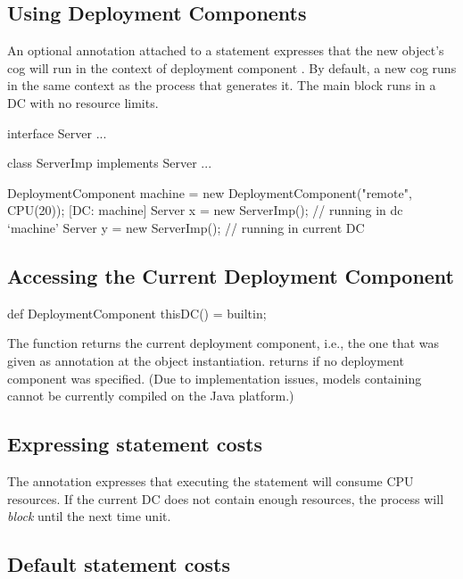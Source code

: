 \subsection{Using Deployment Components}

   An optional annotation \absinline{[DC: x]} attached to a 
   statement expresses that the new object's cog will run in the context
   of deployment component .  By default, a new cog runs in the
   same context as the process that generates it.  The main block runs
   in a DC with no resource limits.

\begin{absexample} 
interface Server { ... }

class ServerImp implements Server { ... }

{
  DeploymentComponent machine = new DeploymentComponent("remote",
      CPU(20));
  [DC: machine] Server x = new ServerImp();  // running in dc `machine'
  Server y = new ServerImp();                // running in current DC
}
\end{absexample} 

\subsection{Accessing the Current Deployment Component}

\begin{absexample} 
def DeploymentComponent thisDC() = builtin;
\end{absexample} 

   The  function returns the current deployment
   component, i.e., the one that was given as annotation at the 
   object instantiation.   returns  if no
   deployment component was specified.  (Due to implementation issues,
   models containing  cannot be currently compiled on the
   Java platform.)

\subsection{Expressing statement costs}

   The annotation  expresses that executing the
   statement  will consume  CPU resources.  If the current
   DC does not contain enough resources, the process will \emph{block} until
   the next time unit.

\subsection{Default statement costs}

